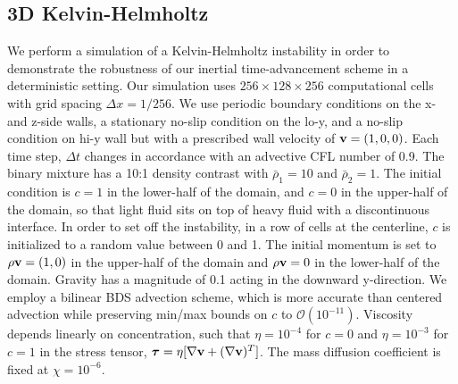 \documentclass[final]{siamltex}
\def\vb {{\bf v}}
\def\taub   {\boldsymbol{\tau}}
\begin{document}
\subsection{3D Kelvin-Helmholtz}
We perform a simulation of a Kelvin-Helmholtz instability in order to demonstrate
the robustness of our inertial time-advancement scheme in a deterministic setting.
Our simulation uses $256\times 128\times 256$ computational cells with grid spacing
$\Delta x=1/256$.  We use periodic boundary conditions on the x- and z-side walls, a 
stationary no-slip condition on the lo-y, and a no-slip condition on hi-y wall
but with a prescribed wall velocity of $\vb=(1,0,0)$.
Each time step, $\Delta t$ changes in accordance with an
advective CFL number of 0.9.  The binary mixture has a 10:1 density contrast with
$\bar\rho_1=10$ and $\bar\rho_2=1$.  The initial condition is $c=1$ in the lower-half
of the domain, and $c=0$ in the upper-half of the domain, so that light fluid
sits on top of heavy fluid with a discontinuous interface.
In order to set off the instability, 
in a row of cells at the centerline, $c$ is initialized to a random value between 0 and 1.
The initial momentum is set to $\rho\vb=(1,0)$ in the upper-half of
the domain and $\rho\vb=0$ in the lower-half of the domain.
Gravity has a magnitude of 0.1 acting in the downward y-direction.
We employ a bilinear BDS advection scheme, which is more accurate than centered
advection while preserving min/max bounds on $c$ to $\mathcal O(10^{-11})$.
Viscosity depends linearly on concentration, such that $\eta=10^{-4}$ for $c=0$ 
and $\eta=10^{-3}$ for $c=1$ in the stress tensor,
$\taub = \eta[\nabla\vb + (\nabla\vb)^T]$.
The mass diffusion coefficient is fixed at $\chi=10^{-6}$.
\end{document}
